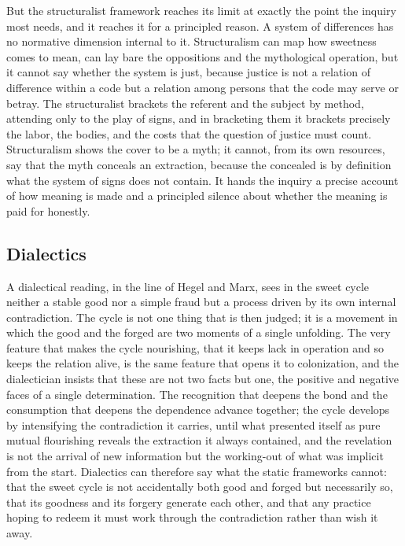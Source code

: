 \documentclass[11pt,a4paper]{article}
\begin{document}
But the structuralist framework reaches its limit at exactly the point the inquiry most needs, and it reaches it for a principled reason. A system of differences has no normative dimension internal to it. Structuralism can map how sweetness comes to mean, can lay bare the oppositions and the mythological operation, but it cannot say whether the system is just, because justice is not a relation of difference within a code but a relation among persons that the code may serve or betray. The structuralist brackets the referent and the subject by method, attending only to the play of signs, and in bracketing them it brackets precisely the labor, the bodies, and the costs that the question of justice must count. Structuralism shows the cover to be a myth; it cannot, from its own resources, say that the myth conceals an extraction, because the concealed is by definition what the system of signs does not contain. It hands the inquiry a precise account of how meaning is made and a principled silence about whether the meaning is paid for honestly.

\subsection{Dialectics}

A dialectical reading, in the line of Hegel and Marx, sees in the sweet cycle neither a stable good nor a simple fraud but a process driven by its own internal contradiction. The cycle is not one thing that is then judged; it is a movement in which the good and the forged are two moments of a single unfolding. The very feature that makes the cycle nourishing, that it keeps lack in operation and so keeps the relation alive, is the same feature that opens it to colonization, and the dialectician insists that these are not two facts but one, the positive and negative faces of a single determination. The recognition that deepens the bond and the consumption that deepens the dependence advance together; the cycle develops by intensifying the contradiction it carries, until what presented itself as pure mutual flourishing reveals the extraction it always contained, and the revelation is not the arrival of new information but the working-out of what was implicit from the start. Dialectics can therefore say what the static frameworks cannot: that the sweet cycle is not accidentally both good and forged but necessarily so, that its goodness and its forgery generate each other, and that any practice hoping to redeem it must work through the contradiction rather than wish it away.
\end{document}
